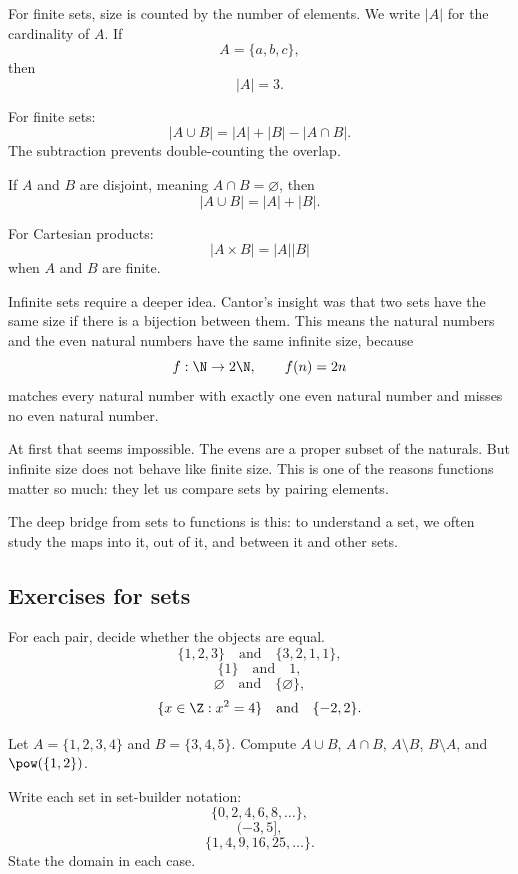 For finite sets, size is counted by the number of elements. We write $|A|$ for the cardinality of $A$. If
\[
A=\{a,b,c\},
\]
then
\[
|A|=3.
\]

For finite sets:
\[
|A\cup B|=|A|+|B|-|A\cap B|.
\]
The subtraction prevents double-counting the overlap.

If $A$ and $B$ are disjoint, meaning $A\cap B=\varnothing$, then
\[
|A\cup B|=|A|+|B|.
\]

For Cartesian products:
\[
|A\times B|=|A||B|
\]
when $A$ and $B$ are finite.

Infinite sets require a deeper idea. Cantor's insight was that two sets have the same size if there is a bijection between them. This means the natural numbers and the even natural numbers have the same infinite size, because
\[
f:\N\to 2\N,\qquad f(n)=2n
\]
matches every natural number with exactly one even natural number and misses no even natural number.

At first that seems impossible. The evens are a proper subset of the naturals. But infinite size does not behave like finite size. This is one of the reasons functions matter so much: they let us compare sets by pairing elements.

\begin{focusbox}
The deep bridge from sets to functions is this: to understand a set, we often study the maps into it, out of it, and between it and other sets.
\end{focusbox}

\subsection{Exercises for sets}

\begin{exercise}
For each pair, decide whether the objects are equal.
\[
\{1,2,3\}\quad\text{and}\quad\{3,2,1,1\},
\]
\[
\{1\}\quad\text{and}\quad 1,
\]
\[
\varnothing\quad\text{and}\quad\{\varnothing\},
\]
\[
\{x\in\Z:x^2=4\}\quad\text{and}\quad\{-2,2\}.
\]
\end{exercise}

\begin{exercise}
Let $A=\{1,2,3,4\}$ and $B=\{3,4,5\}$. Compute $A\cup B$, $A\cap B$, $A\setminus B$, $B\setminus A$, and $\pow(\{1,2\})$.
\end{exercise}

\begin{exercise}
Write each set in set-builder notation:
\[
\{0,2,4,6,8,\ldots\},
\]
\[
(-3,5],
\]
\[
\{1,4,9,16,25,\ldots\}.
\]
State the domain in each case.
\end{exercise}

